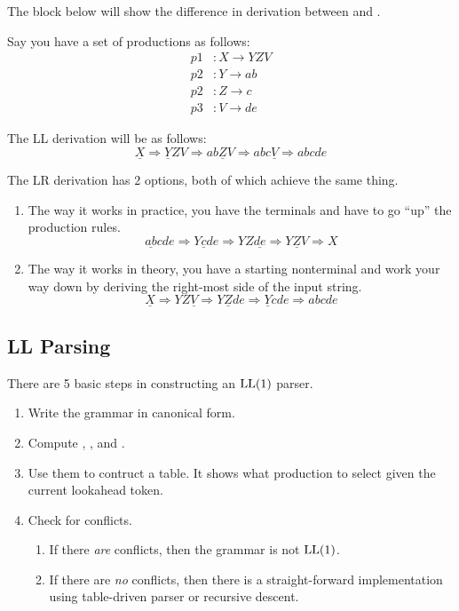 The block below will show the difference in derivation between  and .
\begin{blackbox}
  Say you have a set of productions as follows:
  \begin{align*}
    p1&: X \rightarrow YZV \\
    p2&: Y \rightarrow ab \\
    p2&: Z \rightarrow c \\
    p3&: V \rightarrow de
  \end{align*}

  The LL derivation will be as follows:
  \begin{equation*}
    \underline{X} \Rightarrow \underline{Y}ZV \Rightarrow ab\underline{Z}V \Rightarrow abc\underline{V} \Rightarrow abcde
  \end{equation*}

  The LR derivation has 2 options, both of which achieve the same thing.
  \begin{enumerate}[noitemsep]
  \item The way it works in practice, you have the terminals and have to go ``up'' the production rules.
    \begin{equation*}
      \underline{ab}cde \Rightarrow Y\underline{c}de \Rightarrow YZ\underline{de} \Rightarrow \underline{YZV} \Rightarrow X
    \end{equation*}
  \item The way it works in theory, you have a starting nonterminal and work your way down by deriving the right-most side of the input string.
    \begin{equation*}
      \underline{X} \Rightarrow YZ\underline{V} \Rightarrow Y\underline{Z}de \Rightarrow \underline{Y}cde \Rightarrow abcde
    \end{equation*}
  \end{enumerate}
\end{blackbox}

\subsection{LL Parsing}\label{subsec:LLParsing}
There are 5 basic steps in constructing an $\operatorname{\text{LL}}(1)$ parser.
\begin{enumerate}[noitemsep]
\item Write the grammar in canonical form.
\item Compute , , and .
\item Use them to contruct a table. It shows what production to select given the current lookahead token.
\item Check for conflicts.
  \begin{enumerate}[noitemsep]
  \item If there \emph{are} conflicts, then the grammar is not $\operatorname{\text{LL}}(1)$.
  \item If there are \emph{no} conflicts, then there is a straight-forward implementation using table-driven parser or recursive descent.
  \end{enumerate}
\end{enumerate}

